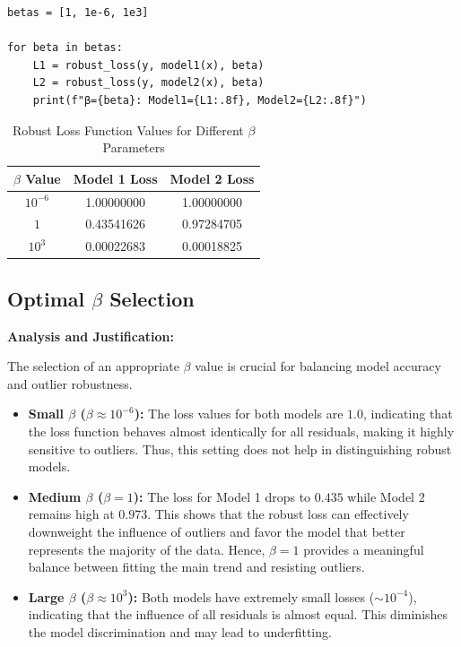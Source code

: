 \documentclass[12pt]{article}
\begin{document}
\begin{lstlisting}[caption={\footnotesize Robust Loss Function Implementation}]
betas = [1, 1e-6, 1e3]

for beta in betas:
    L1 = robust_loss(y, model1(x), beta)
    L2 = robust_loss(y, model2(x), beta)
    print(f"β={beta}: Model1={L1:.8f}, Model2={L2:.8f}")
\end{lstlisting}


\begin{table}[H]
\centering

\label{tab:robust_loss}
\begin{tabular}{@{}ccc@{}}
\toprule
$\beta$ Value & Model 1 Loss & Model 2 Loss \\
\midrule
$10^{-6}$ & 1.00000000 & 1.00000000 \\
$1$ & 0.43541626 & 0.97284705 \\
$10^3$ & 0.00022683 & 0.00018825 \\
\bottomrule
\end{tabular}
\caption{Robust Loss Function Values for Different $\beta$ Parameters}
\end{table}

\subsection{Optimal $\beta$ Selection}

\textbf{Analysis and Justification:}

The selection of an appropriate $\beta$ value is crucial for balancing model accuracy and outlier robustness.

\begin{itemize}
    \item \textbf{Small $\beta$ ($\beta \approx 10^{-6}$):} The loss values for both models are $1.0$, indicating that the loss function behaves almost identically for all residuals, making it highly sensitive to outliers. Thus, this setting does not help in distinguishing robust models.
    
    \item \textbf{Medium $\beta$ ($\beta = 1$):} The loss for Model 1 drops to $0.435$ while Model 2 remains high at $0.973$. This shows that the robust loss can effectively downweight the influence of outliers and favor the model that better represents the majority of the data. Hence, $\beta = 1$ provides a meaningful balance between fitting the main trend and resisting outliers.
    
    \item \textbf{Large $\beta$ ($\beta \approx 10^3$):} Both models have extremely small losses ($\sim 10^{-4}$), indicating that the influence of all residuals is almost equal. This diminishes the model discrimination and may lead to underfitting.
\end{itemize}
\end{document}
